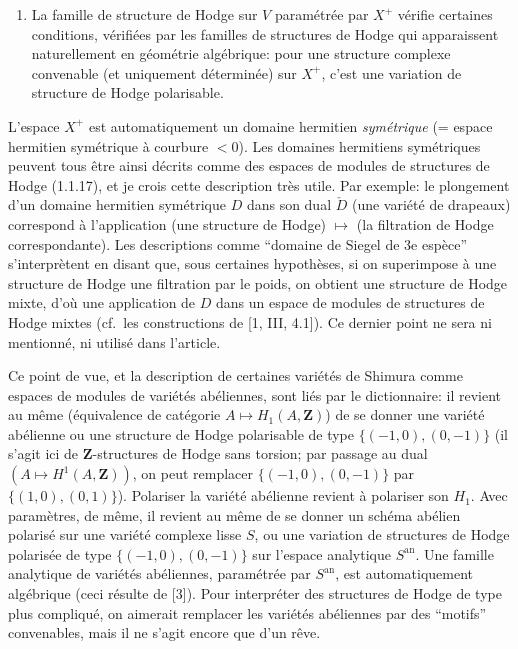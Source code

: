 \documentclass[10pt,a4paper]{article}
\providecommand{\tightlist}{\setlength{\itemsep}{0pt}\setlength{\parskip}{0pt}}
\newcommand{\SourcePage}[2]{\clearpage\setcounter{page}{#2}\typeout{D031_SOURCE_PAGE physical=#1 printed=#2}}
\begin{document}
\SourcePage{2}{248}
\begin{enumerate}
\def\labelenumi{(\alph{enumi})}
\setcounter{enumi}{1}
\tightlist
\item
  La famille de structure de Hodge sur \(V\) paramétrée par \(X^+\) vérifie certaines conditions, vérifiées par les familles de structures de Hodge qui apparaissent naturellement en géométrie algébrique: pour une structure complexe convenable (et uniquement déterminée) sur \(X^+\), c'est une variation de structure de Hodge polarisable.
\end{enumerate}

L'espace \(X^+\) est automatiquement un domaine hermitien \emph{symétrique} (= espace hermitien symétrique à courbure \(<0\)). Les domaines hermitiens symétriques peuvent tous être ainsi décrits comme des espaces de modules de structures de Hodge (1.1.17), et je crois cette description très utile. Par exemple: le plongement d'un domaine hermitien symétrique \(D\) dans son dual \(\check D\) (une variété de drapeaux) correspond à l'application (une structure de Hodge) \(\mapsto\) (la filtration de Hodge correspondante). Les descriptions comme ``domaine de Siegel de 3e espèce'' s'interprètent en disant que, sous certaines hypothèses, si on superimpose à une structure de Hodge une filtration par le poids, on obtient une structure de Hodge mixte, d'où une application de \(D\) dans un espace de modules de structures de Hodge mixtes (cf.~les constructions de {[}1, III, 4.1{]}). Ce dernier point ne sera ni mentionné, ni utilisé dans l'article.

Ce point de vue, et la description de certaines variétés de Shimura comme espaces de modules de variétés abéliennes, sont liés par le dictionnaire: il revient au même (équivalence de catégorie \(A\mapsto H_1(A,\mathbf Z)\)) de se donner une variété abélienne ou une structure de Hodge polarisable de type \(\{(-1,0),(0,-1)\}\) (il s'agit ici de \(\mathbf Z\)-structures de Hodge sans torsion; par passage au dual \((A\mapsto H^1(A,\mathbf Z))\), on peut remplacer \(\{(-1,0),(0,-1)\}\) par \(\{(1,0),(0,1)\}\)). Polariser la variété abélienne revient à polariser son \(H_1\). Avec paramètres, de même, il revient au même de se donner un schéma abélien polarisé sur une variété complexe lisse \(S\), ou une variation de structures de Hodge polarisée de type \(\{(-1,0),(0,-1)\}\) sur l'espace analytique \(S^{\mathrm{an}}\). Une famille analytique de variétés abéliennes, paramétrée par \(S^{\mathrm{an}}\), est automatiquement algébrique (ceci résulte de {[}3{]}). Pour interpréter des structures de Hodge de type plus compliqué, on aimerait remplacer les variétés abéliennes par des ``motifs'' convenables, mais il ne s'agit encore que d'un rêve.
\end{document}
